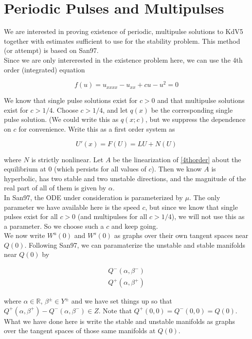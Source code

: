 \documentclass[12pt]{article}
\def\R{{\mathbb R}}
\begin{document}
\section{Periodic Pulses and Multipulses}

We are interested in proving existence of periodic, multipulse solutions to KdV5 together with estimates sufficient to use for the stability problem. This method (or attempt) is based on San97.\\

Since we are only intererested in the existence problem here, we can use the 4th order (integrated) equation

\begin{equation}\label{4thorder}
f(u) = u_{xxxx} - u_{xx} + c u - u^2 = 0
\end{equation}

We know that single pulse solutions exist for $c > 0$ and that multipulse solutions exist for $c > 1/4$. Choose $c > 1/4$, and let $q(x)$ be the corresponding single pulse solution. (We could write this as $q(x; c)$, but we suppress the dependence on $c$ for convenience. Write this as a first order system as

\[
U'(x) = F(U) = LU + N(U)
\]

where $N$ is strictly nonlinear. Let $A$ be the linearization of \eqref{4thorder} about the equilibrium at 0 (which persists for all values of $c$). Then we know $A$ is hyperbolic, has two stable and two unstable directions, and the magnitude of the real part of all of them is given by $\alpha$. 
\\



In San97, the ODE under consideration is parameterized by $\mu$. The only parameter we have available here is the speed $c$, but since we know that single pulses exist for all $c > 0$ (and multipulses for all $c > 1/4$), we will not use this as a parameter. So we choose such a $c$ and keep going.\\

We now write $W^u(0)$ and $W^s(0)$ as graphs over their own tangent spaces near $Q(0)$. Following San97, we can paramaterize the unstable and stable manifolds near $Q(0)$ by

\begin{align*}
Q^-(\alpha, \beta^-) \\
Q^+(\alpha, \beta^+)
\end{align*}

where $\alpha \in \R$, $\beta^\pm \in Y^\pm$ and we have set things up so that $Q^+(\alpha, \beta^+) - Q^-(\alpha, \beta^-) \in Z$. Note that $Q^+(0, 0) = Q^-(0, 0) = Q(0)$. What we have done here is write the stable and unstable manifolds as graphs over the tangent spaces of those same manifolds at $Q(0)$.\\
\end{document}
